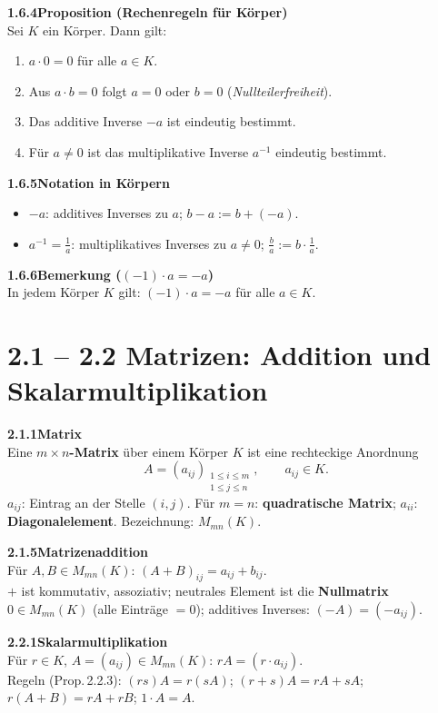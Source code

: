 \documentclass[a4paper,12pt]{article}
\newcommand{\gentry}[3]{%
  \noindent\textbf{#1\quad #2}\nopagebreak\\[0.2em]
  #3\par\smallskip
}
\begin{document}
\gentry{1.6.4}{Proposition (Rechenregeln für Körper)}{%
  Sei $K$ ein Körper. Dann gilt:
  \begin{enumerate}[label=(\alph*),topsep=2pt,itemsep=1pt]
    \item $a \cdot 0 = 0$ für alle $a \in K$.
    \item Aus $a \cdot b = 0$ folgt $a = 0$ oder $b = 0$
          (\emph{Nullteilerfreiheit}).
    \item Das additive Inverse $-a$ ist eindeutig bestimmt.
    \item Für $a \neq 0$ ist das multiplikative Inverse $a^{-1}$
          eindeutig bestimmt.
  \end{enumerate}
}

\gentry{1.6.5}{Notation in Körpern}{%
  \begin{itemize}[topsep=2pt,itemsep=1pt]
    \item $-a$: additives Inverses zu $a$; $b - a := b + (-a)$.
    \item $a^{-1} = \frac{1}{a}$: multiplikatives Inverses zu $a \neq 0$;
          $\frac{b}{a} := b \cdot \frac{1}{a}$.
  \end{itemize}
}

\gentry{1.6.6}{Bemerkung ($(-1) \cdot a = -a$)}{%
  In jedem Körper $K$ gilt: $(-1) \cdot a = -a$ für alle $a \in K$.
}

\section*{2.1 -- 2.2 \quad Matrizen: Addition und Skalarmultiplikation}

\gentry{2.1.1}{Matrix}{%
  Eine \textbf{$m \times n$-Matrix} über einem Körper $K$ ist eine rechteckige
  Anordnung
  \[
    A = (a_{ij})_{\substack{1 \le i \le m \\ 1 \le j \le n}}, \qquad a_{ij} \in K.
  \]
  $a_{ij}$: Eintrag an der Stelle $(i,j)$.
  Für $m = n$: \textbf{quadratische Matrix}; $a_{ii}$: \textbf{Diagonalelement}.
  Bezeichnung: $M_{mn}(K)$.
}

\gentry{2.1.5}{Matrizenaddition}{%
  Für $A, B \in M_{mn}(K)$: $(A+B)_{ij} = a_{ij} + b_{ij}$.
  \smallskip\\
  $+$ ist kommutativ, assoziativ; neutrales Element ist die
  \textbf{Nullmatrix} $0 \in M_{mn}(K)$ (alle Einträge $= 0$);
  additives Inverses: $(-A) = (-a_{ij})$.
}

\gentry{2.2.1}{Skalarmultiplikation}{%
  Für $r \in K$, $A = (a_{ij}) \in M_{mn}(K)$: $rA = (r \cdot a_{ij})$.
  \smallskip\\
  Regeln (Prop.\,2.2.3): $(rs)A = r(sA)$;\; $(r+s)A = rA+sA$;\;
  $r(A+B) = rA+rB$;\; $1 \cdot A = A$.
}
\end{document}
